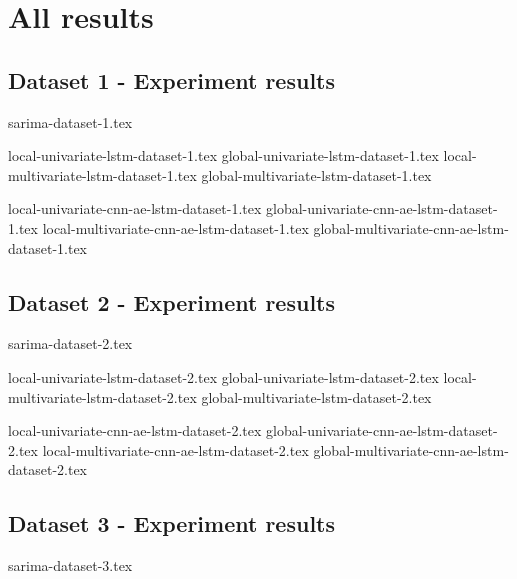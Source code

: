 
\section{All results}
\label{appendix:all-results}

\subsection{Dataset 1 - Experiment results}
{sarima-dataset-1.tex}

{local-univariate-lstm-dataset-1.tex}
{global-univariate-lstm-dataset-1.tex}
{local-multivariate-lstm-dataset-1.tex}
{global-multivariate-lstm-dataset-1.tex}


{local-univariate-cnn-ae-lstm-dataset-1.tex}
{global-univariate-cnn-ae-lstm-dataset-1.tex}
{local-multivariate-cnn-ae-lstm-dataset-1.tex}
{global-multivariate-cnn-ae-lstm-dataset-1.tex}


\subsection{Dataset 2 - Experiment results}
{sarima-dataset-2.tex}

{local-univariate-lstm-dataset-2.tex}
{global-univariate-lstm-dataset-2.tex}
{local-multivariate-lstm-dataset-2.tex}
{global-multivariate-lstm-dataset-2.tex}

{local-univariate-cnn-ae-lstm-dataset-2.tex}
{global-univariate-cnn-ae-lstm-dataset-2.tex}
{local-multivariate-cnn-ae-lstm-dataset-2.tex}
{global-multivariate-cnn-ae-lstm-dataset-2.tex}

\subsection{Dataset 3 - Experiment results}
{sarima-dataset-3.tex}

